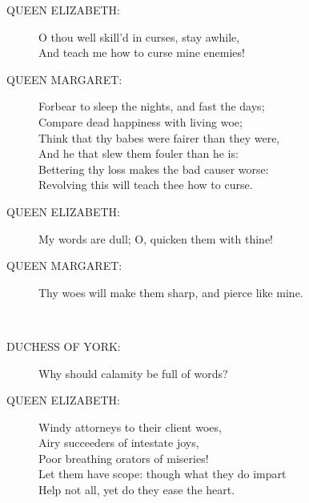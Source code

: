 \documentclass{article}
\begin{document}
\begin{description}
\item[QUEEN ELIZABETH:] 
\hspace{1pt}O thou well skill'd in curses, stay awhile,\\
\hspace{1pt}And teach me how to curse mine enemies!\\
\end{description}
\begin{description}
\item[QUEEN MARGARET:] 
\hspace{1pt}Forbear to sleep the nights, and fast the days;\\
\hspace{1pt}Compare dead happiness with living woe;\\
\hspace{1pt}Think that thy babes were fairer than they were,\\
\hspace{1pt}And he that slew them fouler than he is:\\
\hspace{1pt}Bettering thy loss makes the bad causer worse:\\
\hspace{1pt}Revolving this will teach thee how to curse.\\
\end{description}
\begin{description}
\item[QUEEN ELIZABETH:] 
\hspace{1pt}My words are dull; O, quicken them with thine!\\
\end{description}
\begin{description}
\item[QUEEN MARGARET:] 
\hspace{1pt}Thy woes will make them sharp, and pierce like mine.\\
\end{description}
\centering{\it [Exit]}\\
\begin{description}
\item[DUCHESS OF YORK:] 
\hspace{1pt}Why should calamity be full of words?\\
\end{description}
\begin{description}
\item[QUEEN ELIZABETH:] 
\hspace{1pt}Windy attorneys to their client woes,\\
\hspace{1pt}Airy succeeders of intestate joys,\\
\hspace{1pt}Poor breathing orators of miseries!\\
\hspace{1pt}Let them have scope: though what they do impart\\
\hspace{1pt}Help not all, yet do they ease the heart.\\
\end{description}
\end{document}
